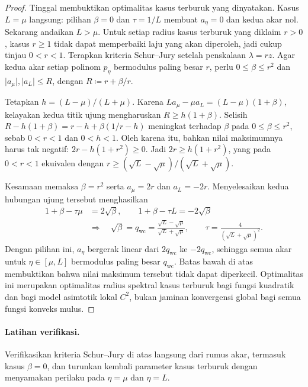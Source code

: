 \begin{proof}
    Tinggal membuktikan optimalitas kasus terburuk yang dinyatakan. Kasus \(L=\mu\) langsung: pilihan \(\beta=0\) dan \(\tau=1/L\) membuat \(a_\eta=0\) dan kedua akar nol. Sekarang andaikan \(L>\mu\). Untuk setiap radius kasus terburuk yang diklaim \(r>0\), kasus \(r\geq1\) tidak dapat memperbaiki laju yang akan diperoleh, jadi cukup tinjau \(0<r<1\). Terapkan kriteria Schur--Jury setelah penskalaan \(\lambda=rz\). Agar kedua akar setiap polinom \(p_\eta\) bermodulus paling besar \(r\), perlu
    \(0\leq\beta\leq r^2\) dan
    \(\lvert a_\mu\rvert,\lvert a_L\rvert\leq R\), dengan
    \(R\coloneqq r+\beta/r\).

    Tetapkan \(h=(L-\mu)/(L+\mu)\). Karena
    \(L a_\mu-\mu a_L=(L-\mu)(1+\beta)\), kelayakan kedua titik ujung mengharuskan
    \(R\geq h(1+\beta)\). Selisih
    \(R-h(1+\beta)=r-h+\beta(1/r-h)\) meningkat terhadap \(\beta\) pada \(0\leq\beta\leq r^2\), sebab \(0<r<1\) dan \(0<h<1\). Oleh karena itu, bahkan nilai maksimumnya harus tak negatif:
    \(2r-h(1+r^2)\geq0\). Jadi \(2r\geq h(1+r^2)\), yang pada \(0<r<1\) ekuivalen dengan
    \(r\geq(\sqrt L-\sqrt\mu)/(\sqrt L+\sqrt\mu)\).

    Kesamaan memaksa \(\beta=r^2\) serta
    \(a_\mu=2r\) dan \(a_L=-2r\). Menyelesaikan kedua hubungan ujung tersebut menghasilkan
    \begin{equation}
        \begin{aligned}
            1+\beta-\tau\mu&=2\sqrt{\beta},\qquad
            1+\beta-\tau L=-2\sqrt{\beta}\\
            &\Longrightarrow\quad
            \sqrt{\beta}=q_{\mathrm{wc}}
            =\frac{\sqrt L-\sqrt\mu}{\sqrt L+\sqrt\mu},
            \qquad
            \tau=\frac{4}{(\sqrt L+\sqrt\mu)^2}.
        \end{aligned}
    \end{equation}
    Dengan pilihan ini, \(a_\eta\) bergerak linear dari \(2q_{\mathrm{wc}}\) ke \(-2q_{\mathrm{wc}}\), sehingga semua akar untuk \(\eta\in[\mu,L]\) bermodulus paling besar \(q_{\mathrm{wc}}\). Batas bawah di atas membuktikan bahwa nilai maksimum tersebut tidak dapat diperkecil. Optimalitas ini merupakan optimalitas radius spektral kasus terburuk bagi fungsi kuadratik dan bagi model asimtotik lokal \(C^2\), bukan jaminan konvergensi global bagi semua fungsi konveks mulus.
\end{proof}

\paragraph{Latihan verifikasi.}
Verifikasikan kriteria Schur--Jury di atas langsung dari rumus akar, termasuk kasus \(\beta=0\), dan turunkan kembali parameter kasus terburuk dengan menyamakan perilaku pada \(\eta=\mu\) dan \(\eta=L\).

